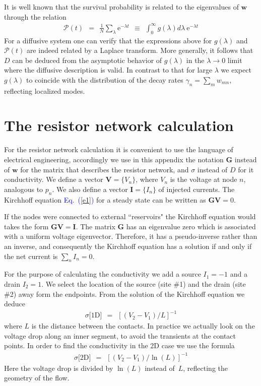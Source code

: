 \documentclass[onecolumn,fleqn,12pt,openany,draft]{book}
\newcommand{\eexp}{\mbox{e}^}
\newcommand{\beq}{\begin{eqnarray}}
\newcommand{\eeq}{\end{eqnarray}}
\newcommand{\Eq}[1]{\textcolor{blue}{Eq.\!\!~(\ref{#1})}}
\begin{document}
It is well known that the survival probability 
is related to the eigenvalues of $\bm{w}$ through the relation
%
\beq 
\mathcal{P}(t) \ \ = \ \ \frac{1}{N}\sum_\lambda \eexp{-\lambda t} 
\ \ \equiv \ \ \int_0^{\infty} g(\lambda)d\lambda \ \eexp{-\lambda t}
\eeq
%
For a diffusive system one can verify that 
the expressions above for $g(\lambda)$ and $\mathcal{P}(t)$ 
are indeed related by a Laplace transform.  
%
More generally, it follows that $D$ can be deduced from 
the asymptotic behavior of $g(\lambda)$
in the ${\lambda\rightarrow 0}$ limit  
where the diffusive description is valid.
%
In contrast to that for large $\lambda$ we expect $g(\lambda)$ to coincide 
with the distribution of the decay rates $\gamma_n=\sum_{m}w_{mn}$, 
reflecting localized modes.


\section{The resistor network calculation}
\label{res}

For the resistor network calculation it is convenient 
to use the language of electrical engineering, 
accordingly we use in this appendix the notation $\bm{G}$ 
instead of $\bm{w}$ for the matrix that describes the 
resistor network, and $\sigma$ instead of $D$ for it conductivity. 
We define a vector $\bm{V}=\{V_n\}$, where $V_n$ is the voltage 
at node $n$, analogous to $p_n$. We also define a vector $\bm{I}=\{I_n\}$ 
of injected currents. The Kirchhoff equation \Eq{e1} for a steady 
state can be written as $\bm{G} \bm{V}=0$. 



If the nodes were connected to external ``reservoirs" 
the Kirchhoff equation would takes the form $\bm{G} \bm{V}=\bm{I}$. 
The matrix $\bm{G}$ has an eigenvalue zero which is associated  
with a uniform voltage eigenvector. Therefore, it has 
a pseudo-inverse rather than an inverse, and consequently 
the Kirchhoff equation has a solution if and only 
if the net current is ${\sum_n I_n=0}$.      


For the purpose of calculating the conductivity
we add a source ${I_1=-1}$ and a drain ${I_2=1}$.
We select the location of the source (site \#1) 
and the drain (site \#2) away form the endpoints. 
From the solution of the Kirchhoff equation we deduce 
%
\beq
\sigma \text{[1D]} \ \ = \ \ \left[(V_2-V_1)/L\right]^{-1} 
\eeq
%
where $L$ is the distance between the contacts.   
In practice we actually look on the  
voltage drop along an inner segment, 
to avoid the transients at the contact points.
%
In order to find the conductivity in the 2D case 
we use the formula 
%
\beq
\sigma \text{[2D]} \ \ = \ \ \left[(V_2-V_1)/\ln(L)\right]^{-1} 
\eeq
%
Here the voltage drop is divided by $\ln(L)$ instead of~$L$, 
reflecting the geometry of the flow.
\end{document}
